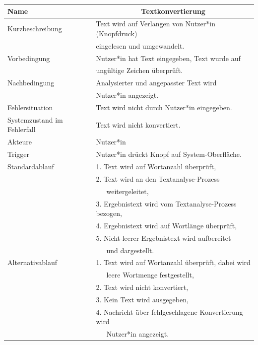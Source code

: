 \documentclass[paper=a4, parskip=half]{scrreprt}
\begin{document}
\begin{table}[htb]
\begin{tabular}{|l|l|}
\hline
Name                        & \multicolumn{1}{c|}{\textbf{Textkonvertierung}} \\ \hline
Kurzbeschreibung            & Text wird auf Verlangen von Nutzer*in (Knopfdruck) \\ 
                            & eingelesen und umgewandelt. \\ \hline
Vorbedingung                & Nutzer*in hat Text eingegeben, Text wurde auf \\
                            & ungültige Zeichen überprüft. \\ \hline
Nachbedingung               & Analysierter und angepasster Text wird \\
                            & Nutzer*in angezeigt. \\ \hline
Fehlersituation             & Text wird nicht durch Nutzer*in eingegeben. \\ \hline
Systemzustand im Fehlerfall & Text wird nicht konvertiert. \\ \hline
Akteure                     & Nutzer*in \\ \hline
Trigger                     & Nutzer*in drückt Knopf auf System-Oberfläche. \\ \hline
Standardablauf              & 1. Text wird auf Wortanzahl überprüft,\\
                            & 2. Text wird an den Textanalyse-Prozess \\ 
                            &    weitergeleitet, \\ 
                            & 3. Ergebnistext wird vom Textanalyse-Prozess bezogen,\\
                            & 4. Ergebnistext wird auf Wortlänge überprüft, \\
                            & 5. Nicht-leerer Ergebnistext wird aufbereitet \\
                            &    und dargestellt. \\ \hline
Alternativablauf            & 1. Text wird auf Wortanzahl überprüft, dabei wird \\
                            &    leere Wortmenge festgestellt, \\
                            & 2. Text wird nicht konvertiert, \\
                            & 3. Kein Text wird ausgegeben, \\
                            & 4. Nachricht über fehlgeschlagene Konvertierung wird \\
                            &    Nutzer*in angezeigt. \\ \hline
\end{tabular}
\end{table}
\end{document}
